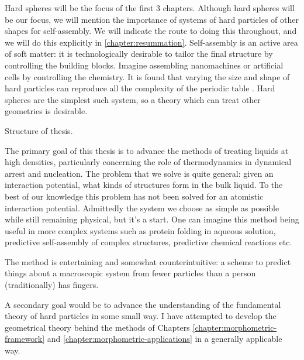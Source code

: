 \documentclass[11pt,twoside]{report}
\def\includebibliography{}
\begin{document}
Hard spheres will be the focus of the first 3 chapters.
Although hard spheres will be our focus, we will mention the importance of systems of hard particles of other shapes for self-assembly.
We will indicate the route to doing this throughout, and we will do this explicitly in \ref{chapter:resummation}.
Self-assembly is an active area of soft matter: it is technologically desirable to tailor the final structure by controlling the building blocks.
Imagine assembling nanomachines or artificial cells by controlling the chemistry.
It is found that varying the size and shape of hard particles can reproduce all the complexity of the periodic table \cite{Glotzer?,Dijkstra?}.
Hard spheres are the simplest such system, so a theory which can treat other geometries is desirable.

Structure of thesis.

The primary goal of this thesis is to advance the methods of treating liquids at high densities, particularly concerning the role of thermodynamics in dynamical arrest and nucleation.
The problem that we solve is quite general: given an interaction potential, what kinds of structures form in the bulk liquid.
To the best of our knowledge this problem has not been solved for an atomistic interaction potential.
Admittedly the system we choose as simple as possible while still remaining physical, but it's a start.
One can imagine this method being useful in more complex systems such as protein folding in aqueous solution, predictive self-assembly of complex structures, predictive chemical reactions etc.

The method is entertaining and somewhat counterintuitive: a scheme to predict things about a macroscopic system from fewer particles than a person (traditionally) has fingers.

A secondary goal would be to advance the understanding of the fundamental theory of hard particles in some small way.
I have attempted to develop the geometrical theory behind the methods of Chapters \ref{chapter:morphometric-framework} and \ref{chapter:morphometric-applications} in a generally applicable way.

\ifdefined\includebibliography
  \printbibliography
\fi
  
\end{document}
